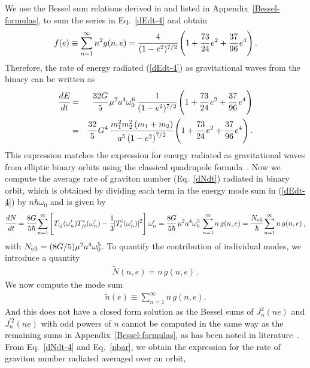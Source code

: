 \documentclass[aps,prd]{revtex4-2}
\begin{document}
\noindent We use the Bessel sum relations derived in \cite{Peters:1963ux} and listed in Appendix~\ref{Bessel-formulas}, to sum the series in Eq.~\eqref{dEdt-4} and obtain
\begin{eqnarray}
	f(e) \equiv \sum_{n = 1}^{\infty} n^{2}g(n,e) = \cfrac{4}{(1-e^{2})^{7/2}}\left(1 + \cfrac{73}{24}\,e^{2} + \cfrac{37}{96}\,e^{4} \right).
\end{eqnarray}
Therefore, the rate of energy radiated (\ref{dEdt-4}) as gravitational waves from the binary can be written as
\begin{eqnarray}\label{PWE}
\cfrac{dE}{dt} &=& \cfrac{32G}{5}\, \mu^2 a^{4}\omega_0^{6}\,\cfrac{1}{(1 - e^{2})^{7/2}}\left(1 + \cfrac{73}{24}\,e^{2} + \cfrac{37}{96}\, e^{4} \right)\nonumber \\
&=& \cfrac{32}{5}\,G^4\,\cfrac{m^2_{1}m^2_{2}\left(m_{1} + m_{2}\right)}{a^{5} \left(1-e^2\right)^{7/2}}\left(1 + \cfrac{73}{24}\,e^{2} + \cfrac{37}{96}\, e^{4} \right).
\end{eqnarray}
This expression matches the expression for energy radiated as gravitational waves from elliptic binary orbits using the classical quadrupole formula~\cite{Peters:1963ux}. Now we compute the average rate of graviton number (Eq.~\eqref{dNdt}) radiated in binary orbit, which   is obtained by dividing each term in  the energy mode sum in  (\ref{dEdt-4}) by $n \hbar \omega_0 $ and is given by
\begin{eqnarray}\label{dNdt-4}
	\cfrac{dN}{dt}  =  \cfrac{8 G}{5 \hbar}  \sum_{n = 1}^\infty\left[T_{ij}(\omega_{n}^{\prime})T_{ji}^{*}(\omega_{n}^{\prime}) - \cfrac{1}{3}|T^{i}_{i}(\omega_{n}^{\prime})|^2\right] \omega_{n}^{\prime }
	 = \cfrac{8G}{5 \hbar} \,\mu^{2} a^{4} \omega_0^{5}\,\sum_{n = 1}^{\infty} n\, g(n,e)
    = \cfrac{N_{\rm ell}}{\hbar} \sum_{n = 1}^{\infty} n\, g(n,e)\,,
\end{eqnarray}
with $N_{\rm ell} = (8G/5)\mu^2 a^4\omega_{0}^5$. To quantify the contribution of individual modes, we introduce a quantity
\begin{eqnarray}
\tilde{N} (n, e) = n\, g(n, e)\,.
\end{eqnarray}
 We now compute the mode sum    
\begin{eqnarray}\label{nbar} 
\tilde{n} (e) \equiv \sum_{n = 1}^{\infty} n\,  g(n,e).
\end{eqnarray}
And this does not have a closed form solution as the Bessel sums of $J_n^2(ne)$ and $J_n^{\prime 2}(ne)$ with odd powers of $n$ cannot be computed in the same way as the remaining sums in Appendix~\ref{Bessel-formulas}, as has been noted in literature~\cite{Forseth:2015oua, Page:2025ncu, Chung:2024ymj}. From Eq.~\eqref{dNdt-4} and Eq.~\eqref{nbar}, we obtain the expression for the rate of graviton number radiated averaged over an orbit,
\end{document}
